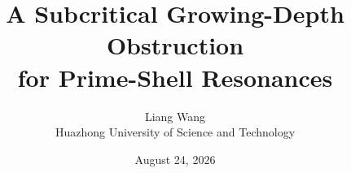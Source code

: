 \documentclass[11pt]{article}
\title{A Subcritical Growing-Depth Obstruction\\for Prime-Shell Resonances}
\author{Liang Wang\\
Huazhong University of Science and Technology}
\date{August 24, 2026}
\begin{document}
\maketitle








{\small}
\end{document}

